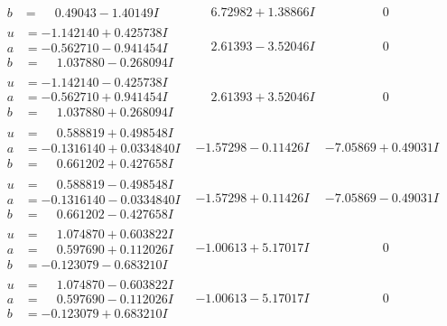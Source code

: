 \documentclass[1p]{elsarticle_modified}
\theoremstyle{definition}
\begin{document}
$$\begin{array}{c|c|c}
\begin{aligned}
b &= \phantom{-}0.49043 - 1.40149 I\end{aligned}
 & \phantom{-}6.72982 + 1.38866 I & \phantom{-0.000000 } 0 \\ \hline\begin{aligned}
u &= -1.142140 + 0.425738 I \\
a &= -0.562710 - 0.941454 I \\
b &= \phantom{-}1.037880 - 0.268094 I\end{aligned}
 & \phantom{-}2.61393 - 3.52046 I & \phantom{-0.000000 } 0 \\ \hline\begin{aligned}
u &= -1.142140 - 0.425738 I \\
a &= -0.562710 + 0.941454 I \\
b &= \phantom{-}1.037880 + 0.268094 I\end{aligned}
 & \phantom{-}2.61393 + 3.52046 I & \phantom{-0.000000 } 0 \\ \hline\begin{aligned}
u &= \phantom{-}0.588819 + 0.498548 I \\
a &= -0.1316140 + 0.0334840 I \\
b &= \phantom{-}0.661202 + 0.427658 I\end{aligned}
 & -1.57298 - 0.11426 I & -7.05869 + 0.49031 I \\ \hline\begin{aligned}
u &= \phantom{-}0.588819 - 0.498548 I \\
a &= -0.1316140 - 0.0334840 I \\
b &= \phantom{-}0.661202 - 0.427658 I\end{aligned}
 & -1.57298 + 0.11426 I & -7.05869 - 0.49031 I \\ \hline\begin{aligned}
u &= \phantom{-}1.074870 + 0.603822 I \\
a &= \phantom{-}0.597690 + 0.112026 I \\
b &= -0.123079 - 0.683210 I\end{aligned}
 & -1.00613 + 5.17017 I & \phantom{-0.000000 } 0 \\ \hline\begin{aligned}
u &= \phantom{-}1.074870 - 0.603822 I \\
a &= \phantom{-}0.597690 - 0.112026 I \\
b &= -0.123079 + 0.683210 I\end{aligned}
 & -1.00613 - 5.17017 I & \phantom{-0.000000 } 0 \\ \hline\begin{aligned}

\end{aligned}
\end{array}$$
\end{document}
